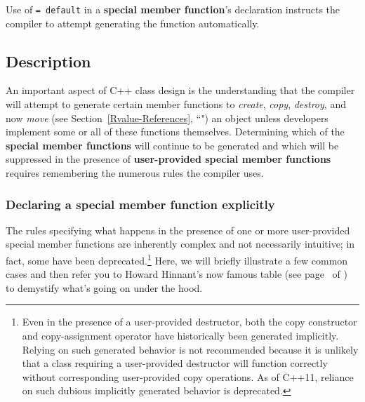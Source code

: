 


Use of \texttt{=}~\texttt{default} in a \textbf{special member function}'s
declaration instructs the compiler to attempt generating the function
automatically.

\subsection[Description]{Description}\label{description}

An important aspect of C++ class design is the understanding that the
compiler will attempt to generate certain member functions to
\emph{create}, \emph{copy}, \emph{destroy}, and now
\emph{move} (see Section~\ref{Rvalue-References}, ``") an object unless
developers implement some or all of these functions
themselves. Determining which of the \textbf{special member functions}
will continue to be generated and which will be suppressed in the
presence of \textbf{user-provided special member functions}
requires remembering the numerous rules the compiler uses.

\subsubsection[Declaring a special member function explicitly]{Declaring a special member function explicitly}\label{declaring-a-special-member-function-explicitly}

The rules specifying what happens in the presence of one or more
user-provided special member functions are inherently complex and not
necessarily intuitive; in fact, some have been
deprecated.{\cprotect\footnote{Even in the presence of a user-provided
destructor, both the copy constructor and copy-assignment operator
have historically been generated implicitly. Relying on such generated
behavior is not recommended because it is unlikely that a class
requiring a user-provided destructor will function correctly without
corresponding user-provided copy operations. As of C++11, reliance on
  such dubious implicitly generated behavior is deprecated.}} Here, we
will briefly illustrate a few common cases and then refer you to Howard
Hinnant's now famous table (see page~\pageref{default-table1} of {\it{}}) to
demystify what's going on under the hood.

